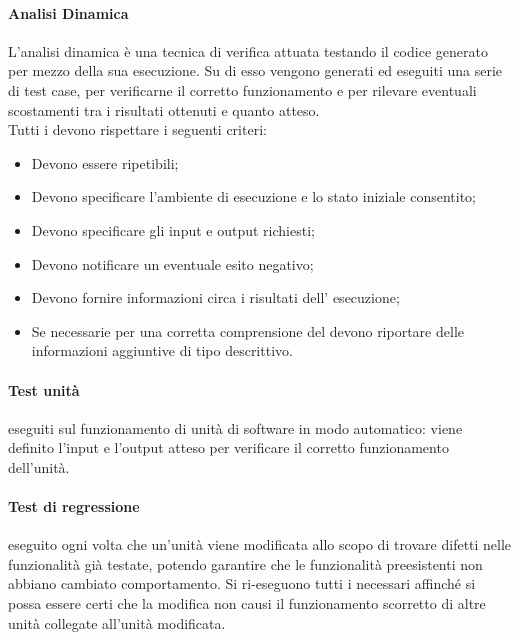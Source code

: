             \paragraph{Analisi Dinamica}
                L’analisi dinamica è una tecnica di verifica attuata testando il codice generato per mezzo della sua esecuzione. Su di esso vengono generati ed eseguiti una serie di test case, per verificarne il corretto funzionamento e per rilevare eventuali scostamenti tra i risultati ottenuti e quanto atteso. \\
                Tutti i  devono rispettare i seguenti criteri: \\
                \begin{itemize}
                    \item Devono essere ripetibili;
                    \item Devono specificare l’ambiente di esecuzione e lo stato iniziale consentito;
                    \item Devono specificare gli input e output richiesti;
                    \item Devono notificare un eventuale esito negativo;
                    \item Devono fornire informazioni circa i risultati dell’ esecuzione;
                    \item Se necessarie per una corretta comprensione del  devono riportare delle informazioni aggiuntive di tipo descrittivo.
                \end{itemize}
                \paragraph{Test unità}
                     eseguiti sul funzionamento di unità di software in modo automatico: viene definito l'input e l'output atteso per verificare il corretto funzionamento dell'unità.\\
                \paragraph{Test di regressione}
                     eseguito ogni volta che un'unità viene modificata allo scopo di trovare difetti nelle funzionalità già testate, potendo garantire che le funzionalità preesistenti non abbiano cambiato comportamento. Si ri-eseguono tutti i  necessari affinché si possa essere certi che la modifica non causi il funzionamento scorretto di altre unità collegate all'unità modificata.\\

